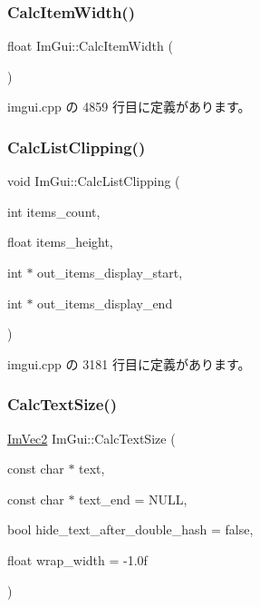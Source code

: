 \subsubsection{\texorpdfstring{Calc\+Item\+Width()}{CalcItemWidth()}}
{\footnotesize\ttfamily float Im\+Gui\+::\+Calc\+Item\+Width (\begin{DoxyParamCaption}{ }\end{DoxyParamCaption})}



 imgui.\+cpp の 4859 行目に定義があります。

\mbox{\label{namespace_im_gui_ae5319370628374ef8febf0c25c285b7e}} 
\subsubsection{\texorpdfstring{Calc\+List\+Clipping()}{CalcListClipping()}}
{\footnotesize\ttfamily void Im\+Gui\+::\+Calc\+List\+Clipping (\begin{DoxyParamCaption}\item[{int}]{items\+\_\+count,  }\item[{float}]{items\+\_\+height,  }\item[{int $\ast$}]{out\+\_\+items\+\_\+display\+\_\+start,  }\item[{int $\ast$}]{out\+\_\+items\+\_\+display\+\_\+end }\end{DoxyParamCaption})}



 imgui.\+cpp の 3181 行目に定義があります。

\mbox{\label{namespace_im_gui_a848b9db6cc4a186751c0ecebcaadc33b}} 
\subsubsection{\texorpdfstring{Calc\+Text\+Size()}{CalcTextSize()}}
{\footnotesize\ttfamily \mbox{\hyperlink{struct_im_vec2}{Im\+Vec2}} Im\+Gui\+::\+Calc\+Text\+Size (\begin{DoxyParamCaption}\item[{const char $\ast$}]{text,  }\item[{const char $\ast$}]{text\+\_\+end = {\ttfamily NULL},  }\item[{bool}]{hide\+\_\+text\+\_\+after\+\_\+double\+\_\+hash = {\ttfamily false},  }\item[{float}]{wrap\+\_\+width = {\ttfamily -\/1.0f} }\end{DoxyParamCaption})}



